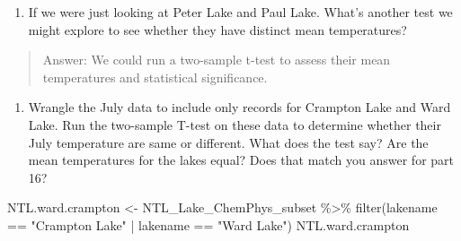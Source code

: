 \documentclass[
]{article}
\newenvironment{Shaded}{\begin{snugshade}}{\end{snugshade}}
\newcommand{\FunctionTok}[1]{\textcolor[rgb]{0.00,0.00,0.00}{#1}}
\newcommand{\NormalTok}[1]{#1}
\newcommand{\OtherTok}[1]{\textcolor[rgb]{0.56,0.35,0.01}{#1}}
\newcommand{\SpecialCharTok}[1]{\textcolor[rgb]{0.00,0.00,0.00}{#1}}
\newcommand{\StringTok}[1]{\textcolor[rgb]{0.31,0.60,0.02}{#1}}
\providecommand{\tightlist}{%
  \setlength{\itemsep}{0pt}\setlength{\parskip}{0pt}}
\begin{document}
\begin{enumerate}
\def\labelenumi{\arabic{enumi}.}
\setcounter{enumi}{16}
\tightlist
\item
  If we were just looking at Peter Lake and Paul Lake. What's another
  test we might explore to see whether they have distinct mean
  temperatures?
\end{enumerate}

\begin{quote}
Answer: We could run a two-sample t-test to assess their mean
temperatures and statistical significance.
\end{quote}

\begin{enumerate}
\def\labelenumi{\arabic{enumi}.}
\setcounter{enumi}{17}
\tightlist
\item
  Wrangle the July data to include only records for Crampton Lake and
  Ward Lake. Run the two-sample T-test on these data to determine
  whether their July temperature are same or different. What does the
  test say? Are the mean temperatures for the lakes equal? Does that
  match you answer for part 16?
\end{enumerate}

\begin{Shaded}
\begin{Highlighting}[]
\NormalTok{NTL.ward.crampton }\OtherTok{\textless{}{-}}\NormalTok{ NTL\_Lake\_ChemPhys\_subset }\SpecialCharTok{\%\textgreater{}\%}
  \FunctionTok{filter}\NormalTok{(lakename }\SpecialCharTok{==} \StringTok{"Crampton Lake"} \SpecialCharTok{|}\NormalTok{ lakename }\SpecialCharTok{==} \StringTok{"Ward Lake"}\NormalTok{)}
\NormalTok{NTL.ward.crampton}
\end{Highlighting}
\end{Shaded}
\end{document}
